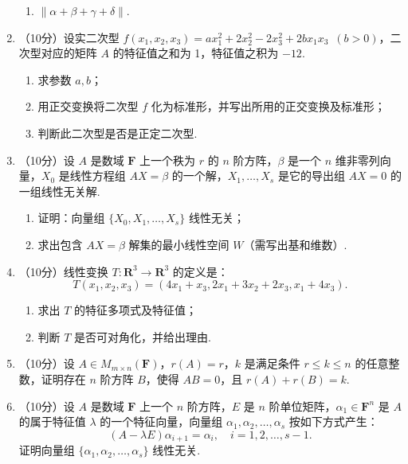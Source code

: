 \begin{enumerate}
\begin{enumerate}
        \item $\lVert \alpha+\beta+\gamma+\delta \rVert$.
    \end{enumerate}

    \item （10分）设实二次型 $f(x_1,x_2,x_3)=ax_1^2+2x_2^2-2x_3^2+2bx_1x_3\enspace(b > 0)$，二次型对应的矩阵 $A$ 的特征值之和为 1，特征值之积为 $-12$.
    \begin{enumerate}
        \item 求参数 $a,b$；

        \item 用正交变换将二次型 $f$ 化为标准形，并写出所用的正交变换及标准形；

        \item 判断此二次型是否是正定二次型.
    \end{enumerate}

    \item （10分）设 $A$ 是数域 $\mathbf{F}$ 上一个秩为 $r$ 的 $n$ 阶方阵，$\beta$ 是一个 $n$ 维非零列向量，$X_0$ 是线性方程组 $AX=\beta$ 的一个解，$X_1,\ldots,X_s$ 是它的导出组 $AX=0$ 的一组线性无关解.
    \begin{enumerate}
        \item 证明：向量组 $\{X_0, X_1,\ldots,X_s\}$ 线性无关；

        \item 求出包含 $AX=\beta$ 解集的最小线性空间 $W$（需写出基和维数）.
    \end{enumerate}

    \item （10分）线性变换 $T \colon \mathbf{R}^3 \to \mathbf{R}^3$ 的定义是：
    \[T(x_1,x_2,x_3)=(4x_1+x_3,2x_1+3x_2+2x_3,x_1+4x_3).\]
    \begin{enumerate}
        \item 求出 $T$ 的特征多项式及特征值；

        \item 判断 $T$ 是否可对角化，并给出理由.
    \end{enumerate}

    \item （10分）设 $A \in M_{m \times n}(\mathbf{F})$，$r(A)=r$，$k$ 是满足条件 $r \leqslant k \leqslant n$ 的任意整数，证明存在 $n$ 阶方阵 $B$，使得 $AB=0$，且 $r(A)+r(B)=k$.

    \item （10分）设 $A$ 是数域 $\mathbf{F}$ 上一个 $n$ 阶方阵，$E$ 是 $n$ 阶单位矩阵，$\alpha_1 \in \mathbf{F}^n$ 是 $A$ 的属于特征值 $\lambda$ 的一个特征向量，向量组 $\alpha_1,\alpha_2,\ldots,\alpha_s$ 按如下方式产生：
    \[(A-\lambda E)\alpha_{i+1}=\alpha_i,\quad i=1,2,\ldots,s-1.\]
    证明向量组 $\{\alpha_1,\alpha_2,\ldots,\alpha_s\}$ 线性无关.


\end{enumerate}
